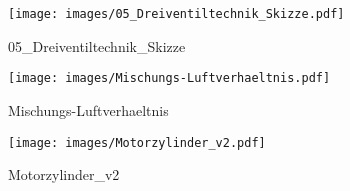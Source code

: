 %
%
\begin{figure}[!hb]%
    \centering
  \texttt{[image: images/05\_Dreiventiltechnik\_Skizze.pdf]}%
  \caption{05_Dreiventiltechnik_Skizze}%
\end{figure}

%
%
\begin{figure}[!hb]%
    \centering
  \texttt{[image: images/Mischungs-Luftverhaeltnis.pdf]}%
  \caption{Mischungs-Luftverhaeltnis}%
\end{figure}

%
%
\begin{figure}[!hb]%
    \centering
  \texttt{[image: images/Motorzylinder\_v2.pdf]}%
  \caption{Motorzylinder_v2}%
\end{figure}


